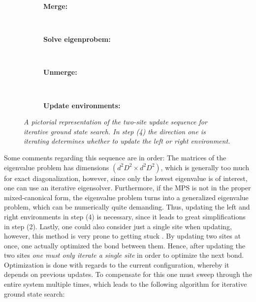 \renewcommand{\thesubfigure}{\arabic{subfigure}}
\begin{figure}[h!]
	\centering
	\begin{subfigure}{\textwidth}
		\centering
		\caption{\textbf{Merge:}}
		
	\end{subfigure}\\[.8cm]
	
	\begin{subfigure}{\textwidth}
		\centering
		\caption{\textbf{Solve eigenprobem:}}
		
	\end{subfigure}\\[.8cm]

	\begin{subfigure}{\textwidth}
		\centering
		\caption{\textbf{Unmerge:}}
		
	\end{subfigure}\\[.8cm]

	\begin{subfigure}{\textwidth}
		\centering
		\caption{\textbf{Update environments:}}
		
	\end{subfigure}
	
	
	\caption{\textit{A pictorial representation of the two-site update sequence for iterative ground state search. In step (4) the direction one is iterating determines whether to update the left or right environment.}}
	\label{fig:twoSiteUpdate}
\end{figure}

Some comments regarding this sequence are in order: The matrices of the eigenvalue problem has dimensions $( d^2 D^2 \times d^2 D^2)$, which is generally too much for exact diagonalization, however, since only the lowest eigenvalue is of interest, one can use an iterative eigensolver. Furthermore, if the MPS is not in the proper mixed-canonical form, the eigenvalue problem turns into a generalized eigenvalue problem, which can be numerically quite demanding. Thus, updating the left and right environments in step (4) is necessary, since it leads to great simplifications in step (2). Lastly, one could also consider just a single site when updating, however, this method is very prone to getting stuck \cite{WhiteSingleSite}. By updating two sites at once, one actually optimized the bond between them. Hence, after updating the two sites \textit{one must only iterate a single site} in order to optimize the next bond. Optimization is done with regards to the current configuration, whereby it depends on previous updates. To compensate for this one must sweep through the entire system multiple times, which leads to the following algorithm for iterative ground state search:

